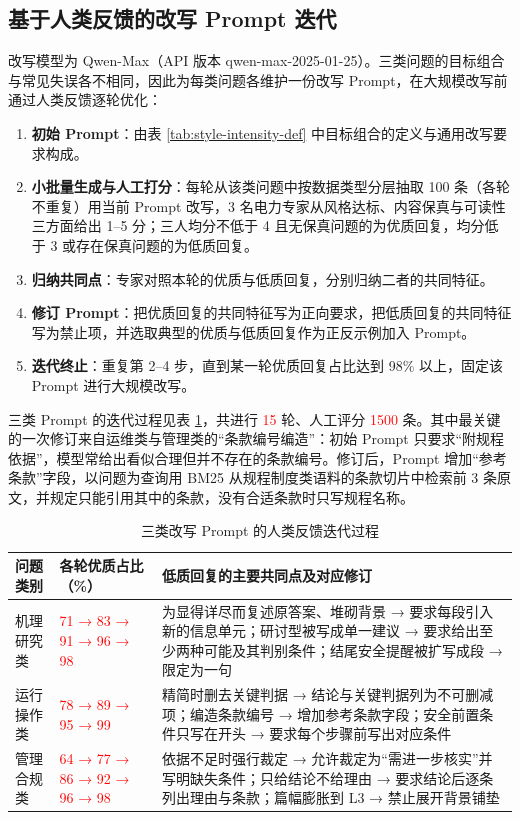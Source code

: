 \documentclass[fontset=fandol,type=master,campus=shenzhen,etitleauto=true]{hithesisbook}
\newcommand{\rev}[1]{\textcolor{red}{#1}}
\providecommand{\tightlist}{%
  \setlength{\itemsep}{0pt}\setlength{\parskip}{0pt}}
\begin{document}
\subsection{基于人类反馈的改写 Prompt 迭代}\label{ux57faux4e8e-sft-ux6570ux636eux7684ux573aux666fux9002ux914dux6539ux5199}

改写模型为 Qwen-Max（API 版本 qwen-max-2025-01-25）。三类问题的目标组合与常见失误各不相同，因此为每类问题各维护一份改写 Prompt，在大规模改写前通过人类反馈逐轮优化：
\begin{enumerate}
\tightlist
\item \textbf{初始 Prompt}：由表 \ref{tab:style-intensity-def} 中目标组合的定义与通用改写要求构成。
\item \textbf{小批量生成与人工打分}：每轮从该类问题中按数据类型分层抽取 100 条（各轮不重复）用当前 Prompt 改写，3 名电力专家从风格达标、内容保真与可读性三方面给出 1--5 分；三人均分不低于 4 且无保真问题的为优质回复，均分低于 3 或存在保真问题的为低质回复。
\item \textbf{归纳共同点}：专家对照本轮的优质与低质回复，分别归纳二者的共同特征。
\item \textbf{修订 Prompt}：把优质回复的共同特征写为正向要求，把低质回复的共同特征写为禁止项，并选取典型的优质与低质回复作为正反示例加入 Prompt。
\item \textbf{迭代终止}：重复第 2--4 步，直到某一轮优质回复占比达到 98\% 以上，固定该 Prompt 进行大规模改写。
\end{enumerate}

三类 Prompt 的迭代过程见表 \ref{tab:rewrite-hf-iter}，共进行 \rev{15} 轮、人工评分 \rev{1500} 条。其中最关键的一次修订来自运维类与管理类的“条款编号编造”：初始 Prompt 只要求“附规程依据”，模型常给出看似合理但并不存在的条款编号。修订后，Prompt 增加“参考条款”字段，以问题为查询用 BM25 从规程制度类语料的条款切片中检索前 3 条原文，并规定只能引用其中的条款，没有合适条款时只写规程名称。

\begin{table}[htbp]
\centering
\caption{三类改写 Prompt 的人类反馈迭代过程}
\label{tab:rewrite-hf-iter}
\small
\setlength{\tabcolsep}{4pt}
\renewcommand{\arraystretch}{1.15}
\begin{tabular}{p{1.9cm}p{3.3cm}p{8.4cm}}
\toprule
\textbf{问题类别} & \textbf{各轮优质占比（\%）} & \textbf{低质回复的主要共同点及对应修订} \\
\midrule
机理研究类 & \rev{71 → 83 → 91 → 96 → 98} & 为显得详尽而复述原答案、堆砌背景 → 要求每段引入新的信息单元；研讨型被写成单一建议 → 要求给出至少两种可能及其判别条件；结尾安全提醒被扩写成段 → 限定为一句 \\
运行操作类 & \rev{78 → 89 → 95 → 99} & 精简时删去关键判据 → 结论与关键判据列为不可删减项；编造条款编号 → 增加参考条款字段；安全前置条件只写在开头 → 要求每个步骤前写出对应条件 \\
管理合规类 & \rev{64 → 77 → 86 → 92 → 96 → 98} & 依据不足时强行裁定 → 允许裁定为“需进一步核实”并写明缺失条件；只给结论不给理由 → 要求结论后逐条列出理由与条款；篇幅膨胀到 L3 → 禁止展开背景铺垫 \\
\bottomrule
\end{tabular}
\end{table}
\end{document}
